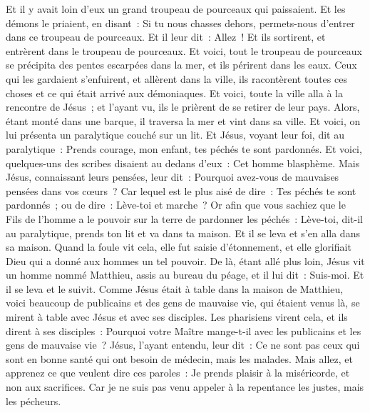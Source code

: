 \begin{multicols}{2}
Et il y avait loin d'eux un grand troupeau de pourceaux qui paissaient.
Et les démons le priaient, en disant~: Si tu nous chasses dehors, permets-nous d'entrer dans ce troupeau de pourceaux.
Et il leur dit~: Allez~! Et ils sortirent, et entrèrent dans le troupeau de pourceaux. Et voici, tout le troupeau de pourceaux se précipita des pentes escarpées dans la mer, et ils périrent dans les eaux.
Ceux qui les gardaient s'enfuirent, et allèrent dans la ville, ils racontèrent toutes ces choses et ce qui était arrivé aux démoniaques.
Et voici, toute la ville alla à la rencontre de Jésus~; et l'ayant vu, ils le prièrent de se retirer de leur pays.
\VerseOne{}Alors, étant monté dans une barque, il traversa la mer et vint dans sa ville.
Et voici, on lui présenta un paralytique couché sur un lit. Et Jésus, voyant leur foi, dit au paralytique~: Prends courage, mon enfant, tes péchés te sont pardonnés.
Et voici, quelques-uns des scribes disaient au dedans d'eux~: Cet homme blasphème.
Mais Jésus, connaissant leurs pensées, leur dit~: Pourquoi avez-vous de mauvaises pensées dans vos cœurs~?
Car lequel est le plus aisé de dire~: Tes péchés te sont pardonnés~; ou de dire~: Lève-toi et marche~?
Or afin que vous sachiez que le Fils de l'homme a le pouvoir sur la terre de pardonner les péchés~: Lève-toi, dit-il au paralytique, prends ton lit et va dans ta maison.
Et il se leva et s'en alla dans sa maison.
Quand la foule vit cela, elle fut saisie d'étonnement, et elle glorifiait Dieu qui a donné aux hommes un tel pouvoir.
De là, étant allé plus loin, Jésus vit un homme nommé Matthieu, assis au bureau du péage, et il lui dit~: Suis-moi. Et il se leva et le suivit.
Comme Jésus était à table dans la maison de Matthieu, voici beaucoup de publicains et des gens de mauvaise vie, qui étaient venus là, se mirent à table avec Jésus et avec ses disciples.
Les pharisiens virent cela, et ils dirent à ses disciples~: Pourquoi votre Maître mange-t-il avec les publicains et les gens de mauvaise vie~?
Jésus, l'ayant entendu, leur dit~: Ce ne sont pas ceux qui sont en bonne santé qui ont besoin de médecin, mais les malades.
Mais allez, et apprenez ce que veulent dire ces paroles~: Je prends plaisir à la miséricorde, et non aux sacrifices. Car je ne suis pas venu appeler à la repentance les justes, mais les pécheurs.

\end{multicols}
